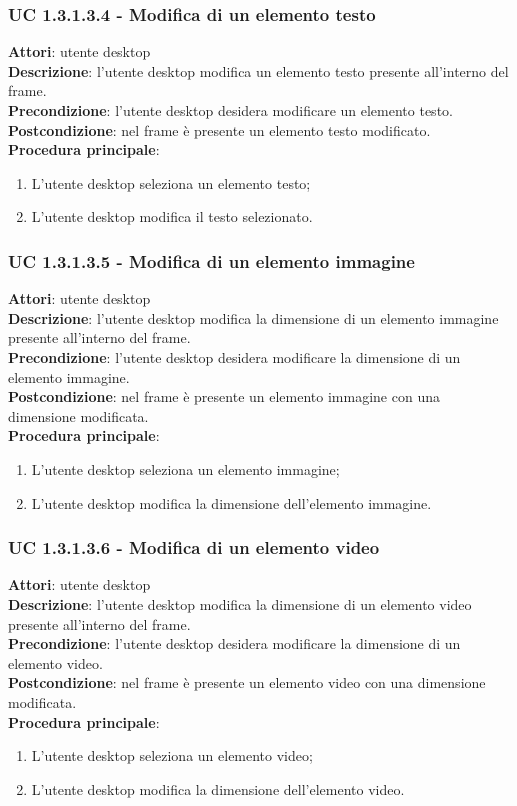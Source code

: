 \subsubsection{UC 1.3.1.3.4 - Modifica di un elemento testo}{
	\label{uc1.3.1.3.4}
	\textbf{Attori}: utente desktop \\
	\textbf{Descrizione}: l'utente desktop modifica un elemento testo presente all'interno del frame. \\
	\textbf{Precondizione}: l'utente desktop desidera modificare un elemento testo.	\\
	\textbf{Postcondizione}: nel frame è presente un elemento testo modificato.	\\
	\textbf{Procedura principale}:
	\begin{enumerate}
		\item L'utente desktop seleziona un elemento testo;
		\item L'utente desktop modifica il testo selezionato.
	\end{enumerate}
	}
\subsubsection{UC 1.3.1.3.5 - Modifica di un elemento immagine}{
	\label{uc1.3.1.3.5}
	\textbf{Attori}: utente desktop \\
	\textbf{Descrizione}: l'utente desktop modifica la dimensione di un elemento immagine presente all'interno del frame. \\
	\textbf{Precondizione}: l'utente desktop desidera modificare la dimensione di un elemento immagine.	\\
	\textbf{Postcondizione}: nel frame è presente un elemento immagine con una dimensione modificata.	\\
	\textbf{Procedura principale}:
	\begin{enumerate}
		\item L'utente desktop seleziona un elemento immagine;
		\item L'utente desktop modifica la dimensione dell'elemento immagine.
	\end{enumerate}
	}
\subsubsection{UC 1.3.1.3.6 - Modifica di un elemento video}{
	\label{uc1.3.1.3.6}
	\textbf{Attori}: utente desktop \\
	\textbf{Descrizione}: l'utente desktop modifica la dimensione di un elemento video presente all'interno del frame. \\
	\textbf{Precondizione}: l'utente desktop desidera modificare la dimensione di un elemento video.	\\
	\textbf{Postcondizione}: nel frame è presente un elemento video con una dimensione modificata.	\\
	\textbf{Procedura principale}:
	\begin{enumerate}
		\item L'utente desktop seleziona un elemento video;
		\item L'utente desktop modifica la dimensione dell'elemento video.
	\end{enumerate}
	}
